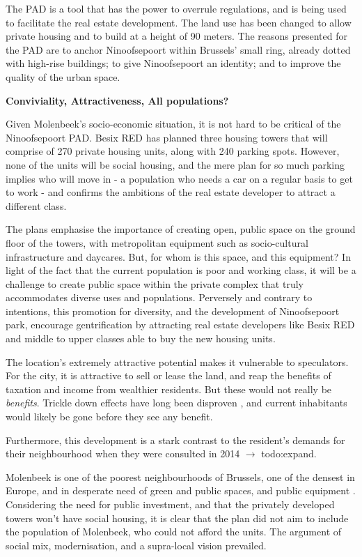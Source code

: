 \documentclass{article}[11pt]
\begin{document}
The PAD is a tool that has the power to overrule regulations, and is being used to facilitate the real estate development. The land use has been changed to allow private housing and to build at a height of 90 meters. The reasons presented for the PAD are to anchor Ninoofsepoort within Brussels' small ring, already dotted with high-rise buildings; to give Ninoofsepoort an identity; and to improve the quality of the urban space.

\textbf{Conviviality, Attractiveness, All populations?}

Given Molenbeek's socio-economic situation, it is not hard to be critical of the Ninoofsepoort PAD. Besix RED has planned three housing towers that will comprise of 270 private housing units, along with 240 parking spots. However, none of the units will be social housing, and the mere plan for so much parking implies who will move in - a population who needs a car on a regular basis to get to work - and confirms the ambitions of the real estate developer to attract a different class.

The plans emphasise the importance of creating open, public space on the ground floor of the towers, with metropolitan equipment such as socio-cultural infrastructure and daycares. But, for whom is this space, and this equipment? In light of the fact that the current population is poor and working class, it will be a challenge to create public space within the private complex that truly accommodates diverse uses and populations. Perversely and contrary to intentions, this promotion for diversity, and the development of Ninoofsepoort park, encourage gentrification by attracting real estate developers like Besix RED and middle to upper classes able to buy the new housing units.

The location's extremely attractive potential makes it vulnerable to speculators. For the city, it is attractive to sell or lease the land, and reap the benefits of taxation and income from wealthier residents. But these would not really be \textit{benefits}. Trickle down effects have long been disproven \parencite{required}, and current inhabitants would likely be gone before they see any benefit.

Furthermore, this development is a stark contrast to the resident's demands for their neighbourhood when they were consulted in 2014 $\rightarrow$ todo:expand.

Molenbeek is one of the poorest neighbourhoods of Brussels, one of the densest in Europe, and in desperate need of green and public spaces, and public equipment \parencite{ieb2019ninove}. Considering the need for public investment, and that the privately developed towers won't have social housing, it is clear that the plan did not aim to include the population of Molenbeek, who could not afford the units. 
The argument of social mix, modernisation, and a supra-local vision prevailed.
\end{document}
